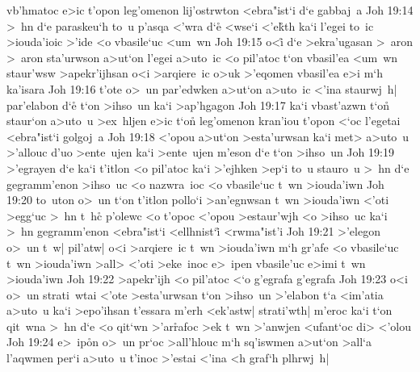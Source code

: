 vb'hmatoc
e>ic
t'opon
leg'omenon
lij'ostrwton
<ebra"ist`i
d`e
gabbaj~a\bibvsend
\vs Joh 19:14
>~hn
d`e
paraskeu`h
to~u
p'asqa
<'wra
d`e\r{}
<wse`i
<'e\r{k}th
ka`i
l'egei
to~ic
>iouda'ioic
>'ide
<o
vbasile`uc
<um~wn\bibvsend
\vs Joh 19:15
o<i\r{}
d`e
>ekra'ugasan
>~aron
>~aron
sta'urwson
a>ut`on
l'egei
a>uto~ic
<o
pil'atoc
t`on
vbasil'ea
<um~wn
staur'wsw
>apekr'ijhsan
o<i
>arqiere~ic
o>uk
>'eqomen
vbasil'ea
e>i
m`h
ka'isara\bibvsend
\vs Joh 19:16
t'ote
o>~un
par'edwken
a>ut`on
a>uto~ic
<'ina
staurwj~h|
par'elabon
d`e\r{}
t`on
>ihso~un
ka`i
>ap'hgagon\bibvsend
\vs Joh 19:17
ka`i
vbast'azwn
t`on\r{}
staur`on
a>uto~u
>ex~hljen
e>ic
t`on\r{}
leg'omenon
kran'iou
t'opon
<`oc
l'egetai
<ebra"ist`i
golgoj~a\bibvsend
\vs Joh 19:18
<'opou
a>ut`on
>esta'urwsan
ka`i
met>
a>uto~u
>'allouc
d'uo
>ente~ujen
ka`i
>ente~ujen
m'eson
d`e
t`on
>ihso~un\bibvsend
\vs Joh 19:19
>'egrayen
d`e
ka`i
t'itlon
<o
pil'atoc
ka`i
>'ejhken
>ep`i
to~u
stauro~u
>~hn
d`e
gegramm'enon
>ihso~uc
<o
nazwra~ioc
<o
vbasile`uc
t~wn
>iouda'iwn\bibvsend
\vs Joh 19:20
to~uton
o>~un
t`on
t'itlon
pollo`i
>an'egnwsan
t~wn
>iouda'iwn
<'oti
>egg`uc
>~hn
t~hc\r{}
p'olewc
<o
t'opoc
<'opou
>estaur'wjh
<o
>ihso~uc
ka`i
>~hn
gegramm'enon
<ebra"ist`i
<ellhnist`i\r{}
<rwma"ist'i\bibvsend
\vs Joh 19:21
>'elegon
o>~un
t~w|
pil'atw|
o<i
>arqiere~ic
t~wn
>iouda'iwn
m`h
gr'afe
<o
vbasile`uc
t~wn
>iouda'iwn
>all>
<'oti
>eke~inoc
e>~ipen
vbasile'uc
e>imi
t~wn
>iouda'iwn\bibvsend
\vs Joh 19:22
>apekr'ijh
<o
pil'atoc
<`o
g'egrafa
g'egrafa\bibvsend
\vs Joh 19:23
o<i
o>~un
strati~wtai
<'ote
>esta'urwsan
t`on
>ihso~un
>'elabon
t`a
<im'atia
a>uto~u
ka`i
>epo'ihsan
t'essara
m'erh
<ek'astw|
strati'wth|
m'eroc
ka`i
t`on
qit~wna
>~hn
d`e
<o
qit`wn
>'ar\r{r}afoc
>ek
t~wn
>'anwjen
<ufant`oc
di>
<'olou\bibvsend
\vs Joh 19:24
e>~ip\r{o}n
o>~un
pr`oc
>all'hlouc
m`h
sq'iswmen
a>ut`on
>all`a
l'aqwmen
per`i
a>uto~u
t'inoc
>'estai
<'ina
<h
graf`h
plhrwj~h|
